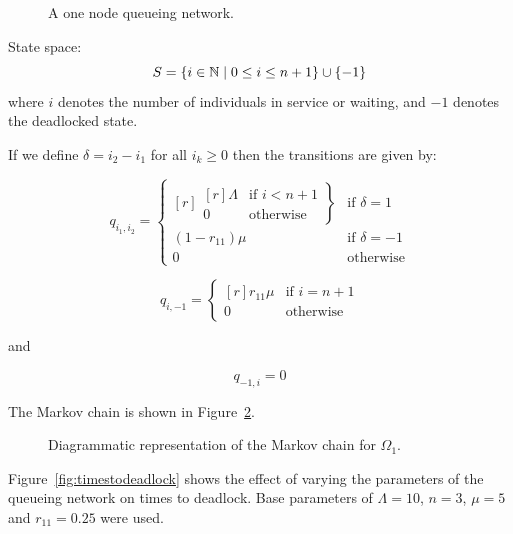 \documentclass{article}
\begin{document}
\begin{figure}[!htbp]
  
  \caption{A one node queueing network.}
  \label{fig:queueingnetwork_1node}
\end{figure}

State space:
        \[S = \{i\in\mathbb{N} \nonscript\; | \nonscript\; 0 \leq i \leq n + 1
        \}\cup\{-1\}\]
where \(i\) denotes the number of individuals in service or waiting, and $-1$ denotes the deadlocked state.

If we define $\delta = i_2 - i_1$ for all $i_k \geq 0$ then the transitions are given by:

\begin{equation}
  q_{i_1, i_2} = \left\{
  \begin{matrix*}[ r ]
    \left. \begin{matrix*}[ r ]
      \Lambda & \text{if } i < n + 1 \\
      0 & \text{otherwise}
    \end{matrix*} \right\} & \text{if } \delta = 1 \\
    (1 - r_{11})\mu & \text{if } \delta = -1 \\
    0 & \text{otherwise}
  \end{matrix*} \right.
\end{equation}

\begin{equation}
  q_{i, -1} = \left\{
  \begin{matrix*}[ r ]
    r_{11}\mu & \text{if } i = n + 1 \\
    0 & \text{otherwise}
  \end{matrix*}
  \right.
\end{equation}

and

\begin{equation}
  q_{-1, i} = 0
\end{equation}

The Markov chain is shown in Figure~\ref{fig:1nodeMC}.

\begin{figure}[!htbp]
    
    \caption{Diagrammatic representation of the Markov chain for $\Omega_1$.}
    \label{fig:1nodeMC}
\end{figure}

Figure~\ref{fig:timestodeadlock} shows the effect of varying the parameters of the queueing network on times to deadlock.
Base parameters of $\Lambda = 10$, $n = 3$, $\mu = 5$ and $r_{11} = 0.25$ were used.
\end{document}
